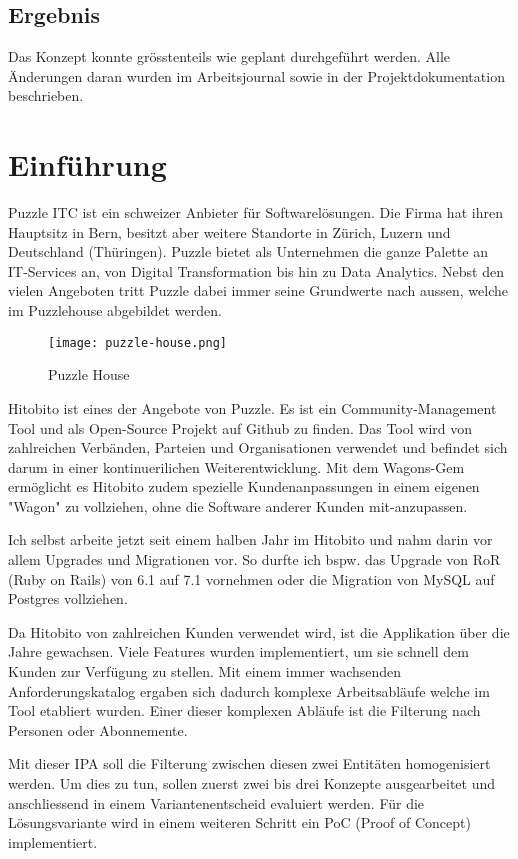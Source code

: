 \section{Ergebnis}
Das Konzept konnte grösstenteils wie geplant durchgeführt werden. Alle Änderungen daran wurden im Arbeitsjournal sowie in der Projektdokumentation
beschrieben.

\chapter{Einführung}
Puzzle ITC ist ein schweizer Anbieter für Softwarelösungen. Die Firma hat ihren Hauptsitz in Bern,
besitzt aber weitere Standorte in Zürich, Luzern und Deutschland (Thüringen). Puzzle bietet als Unternehmen
die ganze Palette an IT-Services an, von Digital Transformation bis hin zu Data Analytics. Nebst den vielen Angeboten
tritt Puzzle dabei immer seine Grundwerte nach aussen, welche im Puzzlehouse abgebildet werden.

\begin{figure}[h]
   \centering
   \texttt{[image: puzzle-house.png]}
   \caption{Puzzle House}
\end{figure}

Hitobito ist eines der Angebote von Puzzle. Es ist ein Community-Management Tool und
als Open-Source Projekt auf Github zu finden. Das Tool wird von zahlreichen Verbänden, Parteien
und Organisationen verwendet und befindet sich darum in einer kontinuerilichen Weiterentwicklung. Mit dem Wagons-Gem
ermöglicht es Hitobito zudem spezielle Kundenanpassungen in einem eigenen "Wagon" zu vollziehen, ohne die Software anderer
Kunden mit-anzupassen.

Ich selbst arbeite jetzt seit einem halben Jahr im Hitobito und nahm darin vor allem Upgrades und Migrationen vor. So durfte ich
bspw. das Upgrade von RoR (Ruby on Rails) von 6.1 auf 7.1 vornehmen oder die Migration von MySQL auf Postgres vollziehen.

Da Hitobito von zahlreichen Kunden verwendet wird, ist die Applikation über die Jahre gewachsen. Viele Features wurden implementiert,
um sie schnell dem Kunden zur Verfügung zu stellen. Mit einem immer wachsenden Anforderungskatalog ergaben sich dadurch komplexe Arbeitsabläufe
welche im Tool etabliert wurden. Einer dieser komplexen Abläufe ist die Filterung nach Personen oder Abonnemente.

Mit dieser IPA soll die Filterung zwischen diesen zwei Entitäten homogenisiert werden. Um dies zu tun,
sollen zuerst zwei bis drei Konzepte ausgearbeitet und anschliessend in einem Variantenentscheid evaluiert werden. Für die Lösungsvariante wird in einem weiteren Schritt ein PoC (Proof of Concept) implementiert. 

